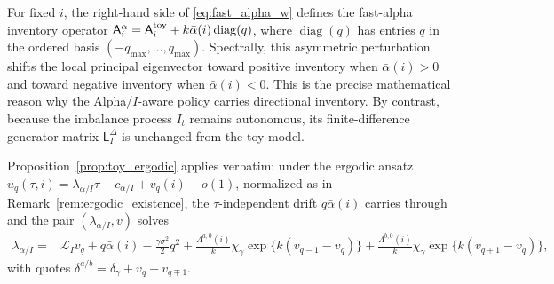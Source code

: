 \documentclass[11pt,a4paper]{article}
\newcommand{\Lcal}{\mathcal{L}}
\newcommand{\alphabar}{\bar\alpha}
\theoremstyle{plain}
\theoremstyle{definition}
\begin{document}
For fixed \(i\), the right-hand side of \eqref{eq:fast_alpha_w} defines the
fast-alpha inventory operator
\(\mathsf A_i^{\alpha}=\mathsf A_i^{\rm toy}+k\alphabar(i)\operatorname{diag}(q)\),
where \(\operatorname{diag}(q)\) has entries \(q\) in the ordered basis
\((-q_{\max},\ldots,q_{\max})\).  Spectrally, this asymmetric perturbation shifts the local principal eigenvector toward positive inventory when \(\alphabar(i)>0\) and toward negative inventory when \(\alphabar(i)<0\). This is the precise mathematical reason why the Alpha/\(I\)-aware policy carries directional inventory. By contrast, because the imbalance process \(I_t\) remains autonomous, its finite-difference generator matrix \(\mathsf L_I^\Delta\) is unchanged from the toy model.

Proposition~\ref{prop:toy_ergodic} applies verbatim: under the ergodic ansatz
\(u_q(\tau,i)=\lambda_{\alpha/I}\tau+c_{\alpha/I}+v_q(i)+o(1)\), normalized as
in Remark~\ref{rem:ergodic_existence}, the \(\tau\)-independent drift
\(q\alphabar(i)\) carries through and the pair \((\lambda_{\alpha/I},v)\)
solves
\begin{align}
\lambda_{\alpha/I}
={}&
\Lcal_Iv_q
+q\alphabar(i)
-\frac{\gamma\sigma^2}{2}q^2
+\frac{\Lambda^{a,0}(i)}{k}\chi_\gamma\exp\{k(v_{q-1}-v_q)\}
+\frac{\Lambda^{b,0}(i)}{k}\chi_\gamma\exp\{k(v_{q+1}-v_q)\},
\label{eq:fast_alpha_ergodic}
\end{align}
with quotes \(\delta^{a/b}=\delta_\gamma+v_q-v_{q\mp1}\).
\end{document}

